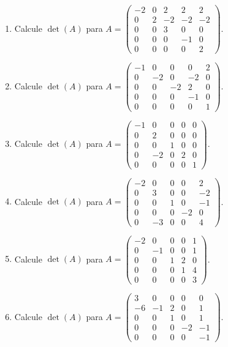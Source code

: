 \documentclass[12pt]{article}
\theoremstyle{remark}
\newcounter{contadorEjercicio}
\newenvironment{listaejercicios}{\begin{enumerate}[label=\textbf{E\arabic*.},leftmargin=2.4em,itemsep=0.52em]\setcounter{enumi}{\value{contadorEjercicio}}}{\setcounter{contadorEjercicio}{\value{enumi}}\end{enumerate}}
\begin{document}
\begin{listaejercicios}
\item Calcule $\det(A)$ para $A=\begin{pmatrix}-2&0&2&2&2\\0&2&-2&-2&-2\\0&0&3&0&0\\0&0&0&-1&0\\0&0&0&0&2\end{pmatrix}$.

\item Calcule $\det(A)$ para $A=\begin{pmatrix}-1&0&0&0&2\\0&-2&0&-2&0\\0&0&-2&2&0\\0&0&0&-1&0\\0&0&0&0&1\end{pmatrix}$.

\item Calcule $\det(A)$ para $A=\begin{pmatrix}-1&0&0&0&0\\0&2&0&0&0\\0&0&1&0&0\\0&-2&0&2&0\\0&0&0&0&1\end{pmatrix}$.

\item Calcule $\det(A)$ para $A=\begin{pmatrix}-2&0&0&0&2\\0&3&0&0&-2\\0&0&1&0&-1\\0&0&0&-2&0\\0&-3&0&0&4\end{pmatrix}$.

\item Calcule $\det(A)$ para $A=\begin{pmatrix}-2&0&0&0&1\\0&-1&0&0&1\\0&0&1&2&0\\0&0&0&1&4\\0&0&0&0&3\end{pmatrix}$.

\item Calcule $\det(A)$ para $A=\begin{pmatrix}3&0&0&0&0\\-6&-1&2&0&1\\0&0&1&0&1\\0&0&0&-2&-1\\0&0&0&0&-1\end{pmatrix}$.

\end{listaejercicios}
\end{document}
